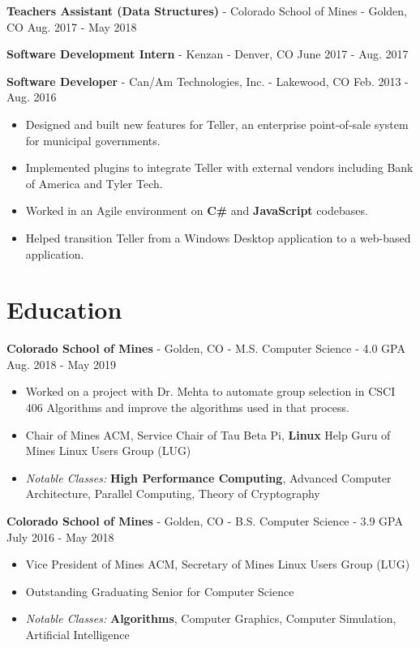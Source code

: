\documentclass[10pt,letterpaper]{article}
\begin{document}
\vspace{2pt}
\textbf{Teachers Assistant (Data Structures)} - Colorado School of Mines -
Golden, CO \hfill Aug. 2017 - May 2018

\vspace{2pt}
\textbf{Software Development Intern} - Kenzan - Denver, CO
\hfill June 2017 - Aug. 2017

\vspace{2pt}
\textbf{Software Developer} - Can/Am Technologies, Inc. - Lakewood, CO
\hfill Feb. 2013 - Aug. 2016
\begin{itemize}
    \item Designed and built new features for Teller, an enterprise
        point-of-sale system for municipal governments.
    \item Implemented plugins to integrate Teller with external vendors
        including Bank of America and Tyler Tech.
    \item Worked in an Agile environment on \textbf{C\#} and \textbf{JavaScript}
        codebases.
    \item Helped transition Teller from a Windows Desktop application to a
        web-based application.
\end{itemize}

\section*{Education}
\textbf{Colorado School of Mines} - Golden, CO - M.S. Computer Science - 4.0 GPA
\hfill Aug. 2018 - May 2019
\begin{itemize}
    \item Worked on a project with Dr. Mehta to automate group selection in
        CSCI 406 Algorithms and improve the algorithms used in that process.
    \item Chair of Mines ACM, Service Chair of Tau Beta Pi, \textbf{Linux} Help
        Guru of Mines Linux Users Group (LUG)
    \item \textit{Notable Classes:} \textbf{High Performance Computing},
        Advanced Computer Architecture, Parallel Computing, Theory of
        Cryptography
\end{itemize}

\textbf{Colorado School of Mines} - Golden, CO - B.S. Computer Science - 3.9 GPA
\hfill July 2016 - May 2018
\begin{itemize}
    \item Vice President of Mines ACM, Secretary of Mines Linux Users Group
        (LUG)
    \item Outstanding Graduating Senior for Computer Science
    \item \textit{Notable Classes:} \textbf{Algorithms}, Computer Graphics,
        Computer Simulation, Artificial Intelligence
\end{itemize}
\end{document}
